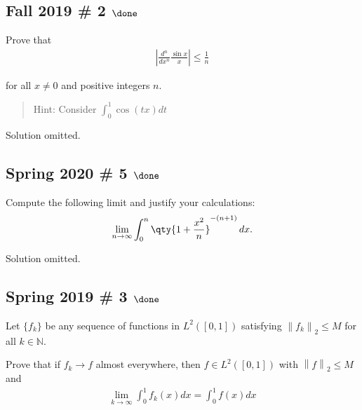 \hypertarget{fall-2019-2-done}{%
\subsection{\texorpdfstring{Fall 2019 \# 2
\(\done\)}{Fall 2019 \# 2 \textbackslash done}}\label{fall-2019-2-done}}

Prove that
\begin{align*}
\left| \frac{d^{n}}{d x^{n}} \frac{\sin x}{x}\right| \leq \frac{1}{n}
\end{align*}

for all \(x \neq 0\) and positive integers \(n\).

\begin{quote}
Hint: Consider \(\displaystyle\int_0^1 \cos(tx) dt\)
\end{quote}

Solution omitted.

\hypertarget{spring-2020-5-done}{%
\subsection{\texorpdfstring{Spring 2020 \# 5
\(\done\)}{Spring 2020 \# 5 \textbackslash done}}\label{spring-2020-5-done}}

Compute the following limit and justify your calculations:
\begin{align*}
\lim_{n\to\infty} \int_0^n \qty{1 + {x^2 \over n}}^{-(n+1)} \,dx
.\end{align*}


Solution omitted.

\hypertarget{spring-2019-3-done}{%
\subsection{\texorpdfstring{Spring 2019 \# 3
\(\done\)}{Spring 2019 \# 3 \textbackslash done}}\label{spring-2019-3-done}}

Let \(\{f_k\}\) be any sequence of functions in \(L^2([0, 1])\)
satisfying \({\left\lVert {f_k} \right\rVert}_2 ≤ M\) for all
\(k ∈ {\mathbb{N}}\).

Prove that if \(f_k \to f\) almost everywhere, then \(f ∈ L^2([0, 1])\)
with \({\left\lVert {f} \right\rVert}_2 ≤ M\) and
\begin{align*}
\lim _{k \rightarrow \infty} \int_{0}^{1} f_{k}(x) dx = \int_{0}^{1} f(x) d x
\end{align*}

